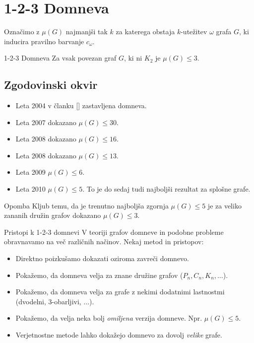 \documentclass{beamer}
\begin{document}
\section{1-2-3 Domneva}
\begin{frame}
\begin{block}{}
	Označimo z $\mu(G)$ najmanjši tak $k$ za katerega obstaja $k$-utežitev $\omega$ grafa $G$, ki inducira pravilno barvanje $c_{\omega}$.
\end{block}
\begin{block}{1-2-3 Domneva}
	Za vsak povezan graf $G$, ki ni $K_2$ je $\mu(G) \le 3$.
\end{block}
\end{frame}

\subsection{Zgodovinski okvir}
\begin{frame}
\begin{itemize}
	\item Leta 2004 v članku [] zastavljena domneva.
	\item Leta 2007 dokazano $\mu(G) \le 30$.
	\item Leta 2008 dokazano $\mu(G) \le 16$.
	\item Leta 2008 dokazano $\mu(G) \le 13$.
	\item Leta 2009 $\mu(G) \le 6$.
	\item Leta 2010 $\mu(G) \le 5$. To je do sedaj tudi najboljši rezultat za splošne grafe.
\end{itemize}

\begin{block}{Opomba}
	Kljub temu, da je trenutno najboljša zgornja $\mu(G) \le 5$ je za veliko zananih družin grafov dokazano $\mu(G) \le 3$. 
\end{block}
\end{frame}

\begin{frame}{Pristopi k 1-2-3 domnevi}
V teoriji grafov domneve in podobne probleme obravnavamo na več različnih načinov. Nekaj metod in pristopov:
\begin{itemize}
	\item Direktno poizkušamo dokazati oziroma zavreči domnevo.
	\item Pokažemo, da domneva velja za znane družine grafov ($P_n, C_n, K_n, \ldots$).
	\item Pokažemo, da domneva velja za grafe z nekimi dodatnimi lastnostmi (dvodelni, 3-obarljivi, $\ldots$).
	\item Pokažemo, da velja neka bolj \textit{omiljena} verzija domneve. Npr. $\mu(G) \le 5$.
	
	\item Verjetnostne metode lahko dokažejo domnevo za dovolj \textit{velike} grafe.
	
\end{itemize}
\end{frame}
\end{document}
